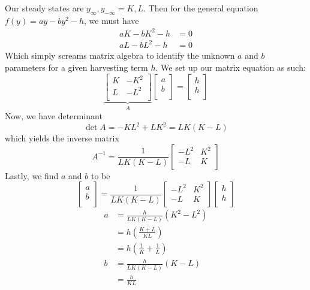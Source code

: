 \documentclass[a4paper]{article}
\begin{document}
Our steady states are \(y_{\infty}, y_{-\infty} = K, L\). Then for the general equation \(f \!\left( y \right) = ay - by^{2} - h\), we must have
\begin{align*}
	aK - bK^{2} - h & = 0 \\
	aL - bL^{2} - h & = 0 
\end{align*}
Which simply screams matrix algebra to identify the unknown \(a\) and \(b\) parameters for a given harvesting term \(h\). We set up our matrix equation as such:
\[
	\underbrace{\begin{bmatrix}
		K & -K^{2} \\
		L & -L^{2} \\
\end{bmatrix}}_{A}
\begin{bmatrix}
	a \\
	b \\
\end{bmatrix}
=
\begin{bmatrix}
	h \\
	h \\
\end{bmatrix}
\]
Now, we have determinant
\[
	\det A = -KL^{2} + LK^{2} = LK \!\left( K - L \right) 
\]
which yields the inverse matrix
\[
	A^{-1} = \frac{1}{LK \!\left( K - L \right) }
	\begin{bmatrix}
		-L^{2} & K^{2} \\
		-L & K \\
	\end{bmatrix}
\]
Lastly, we find \(a\) and \(b\) to be
\[
	\begin{bmatrix}
		a \\
		b \\
	\end{bmatrix}
= \frac{1}{LK \!\left( K - L \right) }
\begin{bmatrix}
	-L^{2} & K^{2} \\
	-L & K \\
\end{bmatrix}
\begin{bmatrix}
	h \\
	h \\
\end{bmatrix}
\]
\begin{align*}
	a & = \frac{h}{LK \!\left( K - L \right) } \!\left( K^{2} - L^{2} \right)  \\
	 & = h \!\left( \frac{K + L}{KL} \right)  \\
	 & = \boxed{h \!\left( \frac{1}{K} + \frac{1}{L} \right)} \\
	b & = \frac{h}{LK \!\left( K - L \right) } \!\left( K - L \right) \\
	  & = \boxed{\frac{h}{KL}}
\end{align*}
\end{document}
